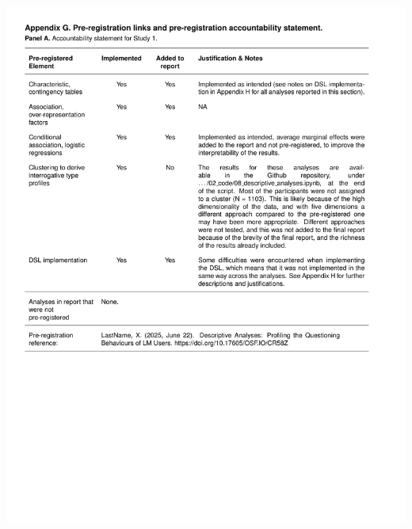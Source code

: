 \documentclass[
  12pt,
]{article}
\begin{document}
\begin{center}\includegraphics{../03_outputs/04_appendices/appendix_g_i} \end{center}
\end{document}
